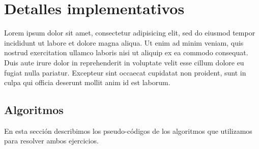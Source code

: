 \section{Detalles implementativos}
Lorem ipsum dolor sit amet, consectetur adipisicing elit, sed do eiusmod
tempor incididunt ut labore et dolore magna aliqua. Ut enim ad minim veniam,
quis nostrud exercitation ullamco laboris nisi ut aliquip ex ea commodo
consequat. Duis aute irure dolor in reprehenderit in voluptate velit esse
cillum dolore eu fugiat nulla pariatur. Excepteur sint occaecat cupidatat non
proident, sunt in culpa qui officia deserunt mollit anim id est laborum.

\subsection{Algoritmos}
En esta sección describimos los pseudo-códigos de los algoritmos que utilizamos para resolver ambos ejercicios.

\begin{center}
\noindent{}

\end{center}